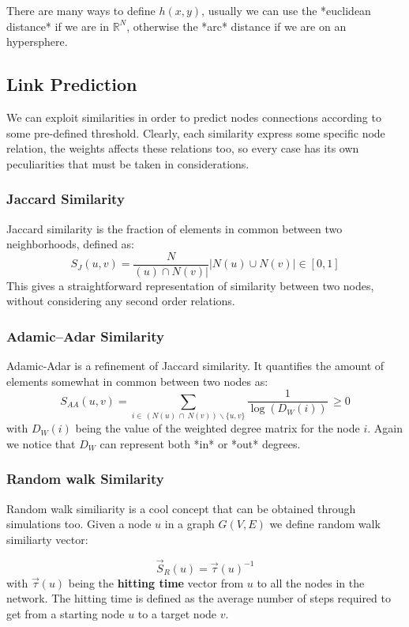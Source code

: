 \documentclass[12pt,a4paper]{article}
\begin{document}
There are many ways to define $h(x,y)$, usually we can use the *euclidean distance* if we are in $\mathbb{R}^N$, otherwise the *arc* distance if we are on an hypersphere.

\subsection{Link Prediction}
We can exploit similarities in order to predict nodes connections according to some pre-defined threshold.
Clearly, each similarity express some specific node relation, the weights affects these relations too, so every case has its own peculiarities that must be taken in considerations.

\subsubsection*{Jaccard Similarity}
Jaccard similarity is the fraction of elements in common between two neighborhoods, defined as:
$$
S_{J}(u,v) = \frac{N}{(u)\cap{N}(v)|}{|{N}(u)\cup{N}(v)|} \in [0,1]
$$
This gives a straightforward representation of similarity between two nodes, without considering any second order relations.

\subsubsection*{Adamic–Adar Similarity}
Adamic-Adar is a refinement of Jaccard similarity. It quantifies the amount of elements somewhat in common between two nodes as:
$$
S_{AA}(u,v) = \sum_{i \in \,\left({N}(u) \, \cap \, {N}(v)\right)\smallsetminus \{u,v\}} \frac{1}{\log ( D_W(i) )} \,\geq 0
$$
with $D_W(i)$ being the value of the weighted degree matrix for the node $i$. Again we notice that $D_W$ can represent both *in* or *out* degrees.

\subsubsection*{Random walk Similarity}
Random walk similiarity is a cool concept that can be obtained through simulations too. Given a node $u$ in a graph $G(V,E)$ we define random walk similiarty vector:

$$
\vec{S}_{R}(u) = \vec{\tau}(u)^{-1}
$$
with $\vec{\tau}(u)$ being the \textbf{hitting time} vector from $u$ to all the nodes in the network. The hitting time is defined as the average number of steps required to get from a starting node $u$ to a target node $v$.
\end{document}
